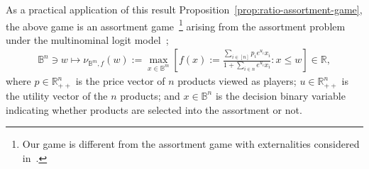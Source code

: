 \documentclass[11pt]{article}\usepackage[]{graphicx}\usepackage[]{xcolor}
\begin{document}
As a practical application of this result Proposition~\ref{prop:ratio-assortment-game}, the above game is an assortment game~\footnote{Our game is different from the assortment game with externalities considered in~\citep{nip2022competitive}.} arising from the assortment problem under the multinominal logit model~\citep{talluri2004revenue};
\begin{eqnarray}
\label{game:packing-subadditive-ratio}\mathbb{B}^n\ni w\mapsto \nu_{\mathbb{B}^m, f}(w):=\max\limits_{x\in \mathbb{B}^m} \left[f(x):=\frac{\sum_{i\in [n]}p_ie^{u_i}x_i}{1+\sum_{i\in n}e^{u_i}x_i}: x\le w\right]\in  \mathbb{R},
\end{eqnarray}
where $p\in\mathbb{R}^n_{++}$ is the price vector of $n$ products viewed as players; $u\in\mathbb{R}^n_{++}$ is the utility vector of the $n$ products; and $x\in\mathbb{B}^n$ is the decision binary variable indicating whether products are selected into the assortment or not.  
\end{document}
